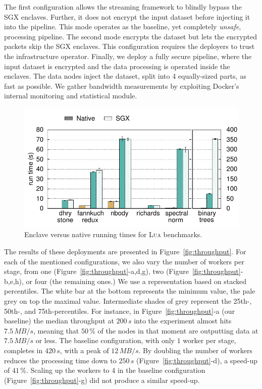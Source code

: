 The first configuration allows the streaming framework to blindly bypass the SGX enclaves.
Further, it does not encrypt the input dataset before injecting it into the pipeline.
This mode operates as the baseline, yet completely \emph{unsafe}, processing pipeline.
The second mode encrypts the dataset but lets the encrypted packets skip the SGX enclaves.
This configuration requires the deployers to trust the infrastructure operator.
Finally, we deploy a fully secure pipeline, where the input dataset is encrypted and the data processing is operated inside the enclaves.
The data nodes inject the dataset, split into 4 equally-sized parts, as fast as possible.
We gather bandwidth measurements by exploiting Docker's internal monitoring and statistical module.

\begin{figure}[t!]
  \centering
  \includegraphics[width=0.75\linewidth]{Figures/plots/microbenchmark_luasgx/microbenchmark_luasgx}
  \caption{Enclave versus native running times for \textsc{Lua} benchmarks.}
  \label{fig:luabenchs}
\end{figure}

The results of these deployments are presented in Figure~\ref{fig:throughput}.
For each of the mentioned configurations, we also vary the number of workers per stage, from one (Figure~\ref{fig:throughput}-a,d,g), two (Figure~\ref{fig:throughput}-b,e,h), or four (the remaining ones.)
We use a representation based on stacked percentiles.
The white bar at the bottom represents the minimum value, the pale grey on top the maximal value.
Intermediate shades of grey represent the 25th-, 50th-, and 75th-percentiles.
For instance, in Figure~\ref{fig:throughput}-a (our baseline) the median throughput at $200\,\mathit{s}$ into the experiment almost hits $7.5\,\mathit{MB/s}$, meaning that $50\,\mathit{\%}$ of the nodes in that moment are outputting data at $7.5\,\mathit{MB/s}$ or less.
The baseline configuration, with only $1$ worker per stage, completes in $420\,\mathit{s}$, with a peak of $12\,\mathit{MB/s}$.
By doubling the number of workers reduces the processing time down to $250\,\mathit{s}$ (Figure~\ref{fig:throughput}-d), a speed-up of $41\,\mathit{\%}$.
Scaling up the workers to 4 in the baseline configuration (Figure~\ref{fig:throughput}-g) did not produce a similar speed-up.

